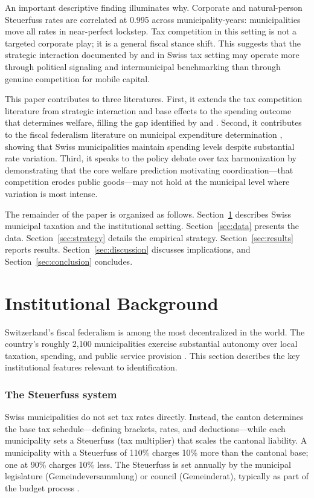\documentclass[12pt]{article}
\begin{document}
An important descriptive finding illuminates why. Corporate and natural-person Steuerfuss rates are correlated at 0.995 across municipality-years: municipalities move all rates in near-perfect lockstep. Tax competition in this setting is not a targeted corporate play; it is a general fiscal stance shift. This suggests that the strategic interaction documented by \citet{eugster2019culture} and \citet{parchet2019culture} in Swiss tax setting may operate more through political signaling and intermunicipal benchmarking than through genuine competition for mobile capital.

This paper contributes to three literatures. First, it extends the tax competition literature from strategic interaction and base effects to the spending outcome that determines welfare, filling the gap identified by \citet{wilson1999theories} and \citet{zodrow2007property}. Second, it contributes to the fiscal federalism literature on municipal expenditure determination \citep{oates1999essay, weingast2009second}, showing that Swiss municipalities maintain spending levels despite substantial rate variation. Third, it speaks to the policy debate over tax harmonization \citep{keen2001preferential, oecd2021pillar2} by demonstrating that the core welfare prediction motivating coordination---that competition erodes public goods---may not hold at the municipal level where variation is most intense.

The remainder of the paper is organized as follows. Section~\ref{sec:background} describes Swiss municipal taxation and the institutional setting. Section~\ref{sec:data} presents the data. Section~\ref{sec:strategy} details the empirical strategy. Section~\ref{sec:results} reports results. Section~\ref{sec:discussion} discusses implications, and Section~\ref{sec:conclusion} concludes.


\section{Institutional Background}
\label{sec:background}

Switzerland's fiscal federalism is among the most decentralized in the world. The country's roughly 2,100 municipalities exercise substantial autonomy over local taxation, spending, and public service provision \citep{feld2010fiscal}. This section describes the key institutional features relevant to identification.

\subsubsection*{The Steuerfuss system} Swiss municipalities do not set tax rates directly. Instead, the canton determines the base tax schedule---defining brackets, rates, and deductions---while each municipality sets a Steuerfuss (tax multiplier) that scales the cantonal liability. A municipality with a Steuerfuss of 110\% charges 10\% more than the cantonal base; one at 90\% charges 10\% less. The Steuerfuss is set annually by the municipal legislature (Gemeindeversammlung) or council (Gemeinderat), typically as part of the budget process \citep{brulhart2012agglomeration}.
\end{document}
